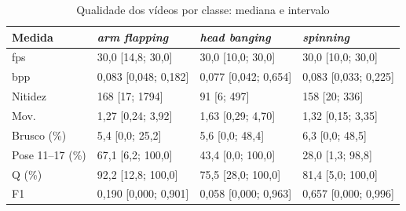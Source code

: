 \begin{table}[htbp]
\centering
\caption{Qualidade dos vídeos por classe: mediana e intervalo}
\label{tab:qualidade-classes}
\begin{tabular}{llll}
\toprule
Medida & \textit{arm flapping} & \textit{head banging} & \textit{spinning} \\
\midrule
fps & 30,0 [14,8; 30,0] & 30,0 [10,0; 30,0] & 30,0 [10,0; 30,0] \\
bpp & 0,083 [0,048; 0,182] & 0,077 [0,042; 0,654] & 0,083 [0,033; 0,225] \\
Nitidez & 168 [17; 1794] & 91 [6; 497] & 158 [20; 336] \\
Mov. & 1,27 [0,24; 3,92] & 1,63 [0,29; 4,70] & 1,32 [0,15; 3,35] \\
Brusco (\%) & 5,4 [0,0; 25,2] & 5,6 [0,0; 48,4] & 6,3 [0,0; 48,5] \\
Pose 11--17 (\%) & 67,1 [6,2; 100,0] & 43,4 [0,0; 100,0] & 28,0 [1,3; 98,8] \\
Q (\%) & 92,2 [12,8; 100,0] & 75,5 [28,0; 100,0] & 81,4 [5,0; 100,0] \\
F1 & 0,190 [0,000; 0,901] & 0,058 [0,000; 0,963] & 0,657 [0,000; 0,996] \\
\bottomrule
\end{tabular}
\end{table}
